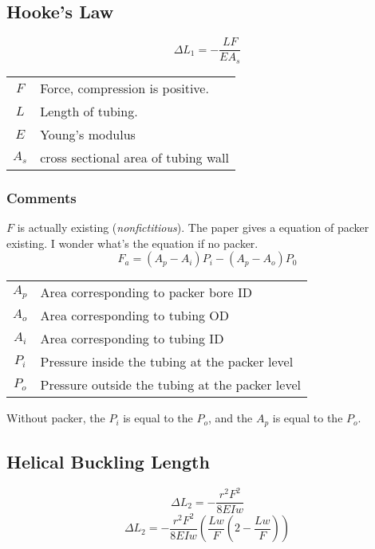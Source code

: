 \documentclass{article}
\begin{document}
\subsection{Hooke's Law}

\begin{equation} \label{eqHooke}
\Delta L_1 = - \frac{LF}{EA_s}
\end{equation}
\begin{center}
\begin{tabular}{c l}
$F$ & Force, compression is positive. \\
$L$ & Length of tubing. \\
$E$ & Young's modulus \\
$A_s$ & cross sectional area of tubing wall \\
\end{tabular}
\end{center}

\subsubsection{Comments}
$F$ is actually existing (\emph{nonfictitious}). The paper gives a equation of
packer existing. I wonder what's the equation if no packer.
\begin{equation}\label{eqActualForce}
F_a = (A_p - A_i)P_i - (A_p - A_o)P_0
\end{equation}
\begin{center}
\begin{tabular}{c l}
$A_p$ & Area corresponding to packer bore ID \\
$A_o$ & Area corresponding to tubing OD \\
$A_i$ & Area corresponding to tubing ID \\
$P_i$ & Pressure inside the tubing at the packer level \\
$P_o$ & Pressure outside the tubing at the packer level \\
\end{tabular}
\end{center}
Without packer, the $P_i$ is equal to the $P_o$, and the $A_p$ is equal to the $P_o$.


\subsection{Helical Buckling Length}

\begin{equation} \label{eqBuckle1}
\Delta L_2 = - \frac{r^2F^2}{8EIw} 
\end{equation}
\begin{equation} \label{eqBuckle2}
\Delta L_2 = - \frac{r^2F^2}{8EIw}\left(\frac{Lw}{F}\left(2-\frac{Lw}{F}\right)\right)
\end{equation}
\end{document}

